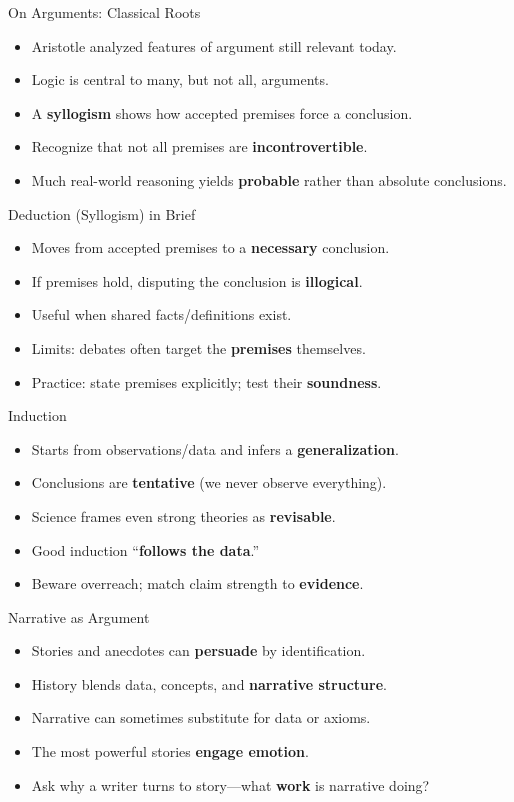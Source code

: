 \documentclass[aspectratio=169]{beamer}
\begin{document}
\begin{frame}{On Arguments: Classical Roots}
\begin{itemize}
  \item Aristotle analyzed features of argument still relevant today.
  \item Logic is central to many, but not all, arguments.
  \item A \textbf{syllogism} shows how accepted premises force a conclusion.
  \item Recognize that not all premises are \textbf{incontrovertible}.
  \item Much real-world reasoning yields \textbf{probable} rather than absolute conclusions.
\end{itemize}
\end{frame}

\begin{frame}{Deduction (Syllogism) in Brief}
\begin{itemize}
  \item Moves from accepted premises to a \textbf{necessary} conclusion.
  \item If premises hold, disputing the conclusion is \textbf{illogical}.
  \item Useful when shared facts/definitions exist.
  \item Limits: debates often target the \textbf{premises} themselves.
  \item Practice: state premises explicitly; test their \textbf{soundness}.
\end{itemize}
\end{frame}

\begin{frame}{Induction}
\begin{itemize}
  \item Starts from observations/data and infers a \textbf{generalization}.
  \item Conclusions are \textbf{tentative} (we never observe everything).
  \item Science frames even strong theories as \textbf{revisable}.
  \item Good induction “\textbf{follows the data}.”
  \item Beware overreach; match claim strength to \textbf{evidence}.
\end{itemize}
\end{frame}

\begin{frame}{Narrative as Argument}
\begin{itemize}
  \item Stories and anecdotes can \textbf{persuade} by identification.
  \item History blends data, concepts, and \textbf{narrative structure}.
  \item Narrative can sometimes substitute for data or axioms.
  \item The most powerful stories \textbf{engage emotion}.
  \item Ask why a writer turns to story—what \textbf{work} is narrative doing?
\end{itemize}
\end{frame}
\end{document}
